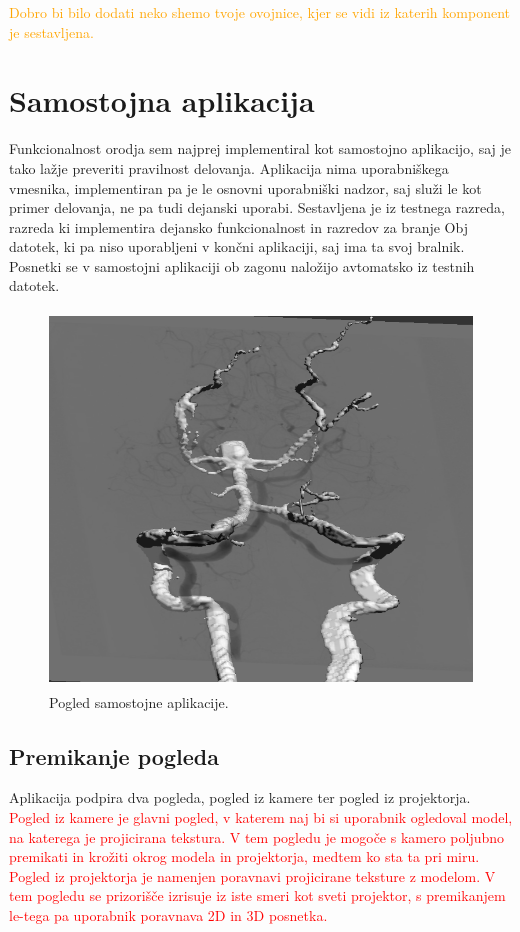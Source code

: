 \documentclass[a4paper, 12pt]{book}
\begin{document}
\textcolor{orange}{Dobro bi bilo dodati neko shemo tvoje ovojnice, kjer se vidi iz katerih komponent je sestavljena.}

\section{Samostojna aplikacija}

Funkcionalnost orodja sem najprej implementiral kot samostojno aplikacijo, saj je tako lažje preveriti pravilnost delovanja. Aplikacija nima uporabniškega vmesnika, implementiran pa je le osnovni uporabniški nadzor, saj služi le kot primer delovanja, ne pa tudi dejanski uporabi. Sestavljena je iz testnega razreda, razreda ki implementira dejansko funkcionalnost in razredov za branje Obj datotek, ki pa niso uporabljeni v končni aplikaciji, saj ima ta svoj bralnik. Posnetki se v samostojni aplikaciji ob zagonu naložijo avtomatsko iz testnih datotek.

\begin{figure}[h]
\begin{center}
\includegraphics[width=12cm, height=10cm, keepaspectratio=true]{Samostojna_aplikacija.png}
\end{center}
\caption{Pogled samostojne aplikacije.}
\label{teksturaprojecirananamodel}
\end{figure}

\subsection*{Premikanje pogleda}

Aplikacija podpira dva pogleda, pogled iz kamere ter pogled iz projektorja. \textcolor{red}{Pogled iz kamere je glavni pogled, v katerem naj bi si uporabnik ogledoval model, na katerega je projicirana tekstura. V tem pogledu je mogoče s kamero poljubno premikati in krožiti okrog modela in projektorja, medtem ko sta ta pri miru. Pogled iz projektorja je namenjen poravnavi projicirane teksture z modelom. V tem pogledu se prizorišče izrisuje iz iste smeri kot sveti projektor, s premikanjem le-tega pa uporabnik poravnava 2D in 3D posnetka.}
\end{document}
